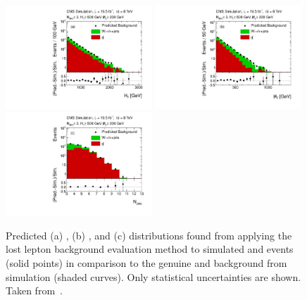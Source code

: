 \begin{figure}[!t]
  \centering

  \begin{minipage}[c]{1.\textwidth}
    \begin{center}
      \includegraphics[width=0.49\textwidth]{figures/RA2_LL1.pdf}%
      \includegraphics[width=0.49\textwidth]{figures/RA2_LL2.pdf}\\ 
      \includegraphics[width=0.49\textwidth]{figures/RA2_LL3.pdf}
    \end{center}
  \end{minipage}

  \caption{Predicted (a) \HT, (b) \MHT, and (c) \NJets distributions found from applying the lost lepton background evaluation method to simulated \ttbar and \WJets events (solid points) in comparison to the genuine \ttbar and \WJets background from simulation (shaded curves). Only statistical uncertainties are shown. Taken from~\cite{Chatrchyan:2014lfa}.}
  \label{fig:ra2_ll}
\end{figure}


